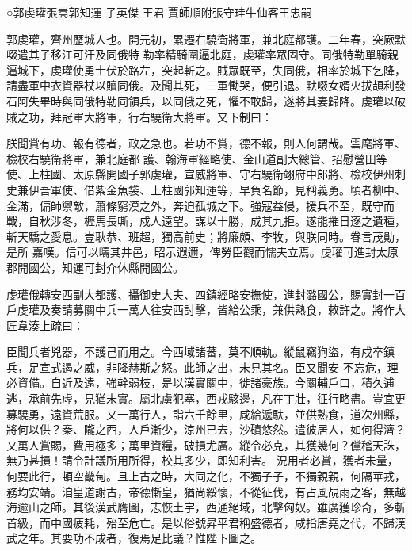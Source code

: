 
\begin{pinyinscope}

 ○郭虔瓘張嵩郭知運
 子英傑
 王君賈師順附張守珪牛仙客王忠嗣



 郭虔瓘，齊州歷城人也。開元初，累遷右驍衛將軍，兼北庭都護。二年春，突厥默啜遣其子移江可汗及同俄特
 勒率精騎圍逼北庭，虔瓘率眾固守。同俄特勒單騎親逼城下，虔瓘使勇士伏於路左，突起斬之。賊眾既至，失同俄，相率於城下乞降，請盡軍中衣資器杖以贖同俄。及聞其死，三軍慟哭，便引退。默啜女婿火拔頡利發石阿失畢時與同俄特勒同領兵，以同俄之死，懼不敢歸，遂將其妻歸降。虔瓘以破賊之功，拜冠軍大將軍，行右驍衛大將軍。又下制曰：



 朕聞賞有功、報有德者，政之急也。若功不賞，德不報，則人何謂哉。雲麾將軍、檢校右驍衛將軍，兼北庭都
 護、翰海軍經略使、金山道副大總管、招慰營田等使、上柱國、太原縣開國子郭虔瓘，宣威將軍、守右驍衛翊府中郎將、檢校伊州刺史兼伊吾軍使、借紫金魚袋、上柱國郭知運等，早負名節，見稱義勇。頃者柳中、金滿，偏師禦敵，蕭條窮漠之外，奔迫孤城之下。強寇益侵，援兵不至，既守而戰，自秋涉冬，櫪馬長嘶，戍人遠望。謀以十勝，成其九拒。遂能摧日逐之遺種，斬天驕之愛息。豈耿恭、班超，獨高前史；將廉頗、李牧，與朕同時。眷言茂勛，是所
 嘉嘆。信可以疇其井邑，昭示遐邇，俾勞臣觀而懦夫立焉。虔瓘可進封太原郡開國公，知運可封介休縣開國公。



 虔瓘俄轉安西副大都護、攝御史大夫、四鎮經略安撫使，進封潞國公，賜實封一百戶虔瓘及奏請募關中兵一萬人往安西討擊，皆給公乘，兼供熟食，敕許之。將作大匠韋湊上疏曰：



 臣聞兵者兇器，不護己而用之。今西域諸蕃，莫不順軌。縱鼠竊狗盜，有戍卒鎮兵，足宣式遏之威，非降赫斯之怒。此師之出，未見其名。臣又聞安
 不忘危，理必資備。自近及遠，強幹弱枝，是以漢實關中，徙諸豪族。今關輔戶口，積久逋逃，承前先虛，見猶未實。屬北虜犯塞，西戎駭邊，凡在丁壯，征行略盡。豈宜更募驍勇，遠資荒服。又一萬行人，詣六千餘里，咸給遞馱，並供熟食，道次州縣，將何以供？秦、隴之西，人戶漸少，涼州已去，沙磧悠然。遣彼居人，如何得濟？又萬人賞賜，費用極多；萬里資糧，破損尤廣。縱令必克，其獲幾何？儻稽天誅，無乃甚損！請令計議所用所得，校其多少，即知利害。
 況用者必賞，獲者未量，何要此行，頓空畿甸。且上古之時，大同之化，不獨子子，不獨親親，何隔華戎，務均安靖。洎皇道謝古，帝德慚皇，猶尚綏懷，不從征伐，有占風覘雨之客，無越海逾山之師。其後漢武膺圖，志恢土宇，西通絕域，北擊匈奴。雖廣獲珍奇，多斬首級，而中國疲耗，殆至危亡。是以俗號昇平君稱盛德者，咸指唐堯之代，不歸漢武之年。其要功不成者，復焉足比議？惟陛下圖之。




\end{pinyinscope}
